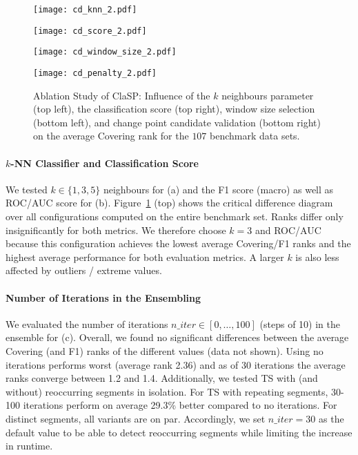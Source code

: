 \documentclass[pdflatex,sn-basic]{sn-jnl}
\begin{document}
\begin{figure}[t]
	\begin{minipage}{6cm}
        \texttt{[image: cd\_knn\_2.pdf]}
	\end{minipage}
	\begin{minipage}{6cm}
        \texttt{[image: cd\_score\_2.pdf]}
	\end{minipage}
	\begin{minipage}{6cm}
        \texttt{[image: cd\_window\_size\_2.pdf]}
	\end{minipage}
	\begin{minipage}{6cm}
        \texttt{[image: cd\_penalty\_2.pdf]}
	\end{minipage}
	\caption{Ablation Study of ClaSP: Influence of the $k$ neighbours parameter (top left), the classification score (top right), window size selection (bottom left), and change point candidate validation (bottom right) on the average Covering rank for the $107$ benchmark data sets.\label{fig:cd_design_choices}
	}
\end{figure}

\paragraph{$k$-NN Classifier and Classification Score}
We tested $k \in \{1,3,5\}$ neighbours for (a) and the F1 score (macro) as well as ROC/AUC score for (b). Figure~\ref{fig:cd_design_choices} (top) shows the critical difference diagram over all configurations computed on the entire benchmark set. Ranks differ only insignificantly for both metrics. We therefore choose $k=3$ and ROC/AUC because this configuration achieves the lowest average Covering/F1 ranks and the highest average performance for both evaluation metrics. A larger $k$ is also less affected by outliers / extreme values.

\paragraph{Number of Iterations in the Ensembling}
We evaluated the number of iterations $n\_iter \in [0,\dots,100]$ (steps of 10) in the ensemble for (c). Overall, we found no significant differences between the average Covering (and F1) ranks of the different values (data not shown). Using no iterations performs worst (average rank 2.36) and as of 30 iterations the average ranks converge between 1.2 and 1.4. Additionally, we tested TS with (and without) reoccurring segments in isolation. For TS with repeating segments, 30-100 iterations perform on average 29.3\% better compared to no iterations. For distinct segments, all variants are on par. Accordingly, we set $n\_iter=30$  as the default value to be able to detect reoccurring segments while limiting the increase in runtime.
\end{document}
